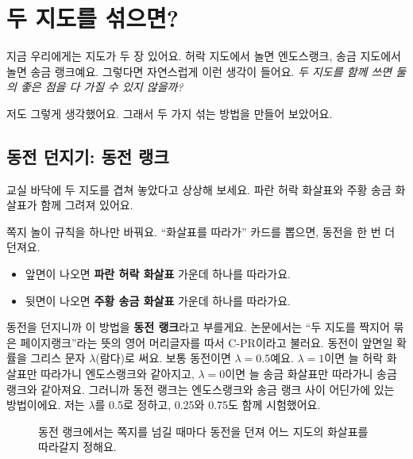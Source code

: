 \chapter{두 지도를 섞으면?}

지금 우리에게는 지도가 두 장 있어요.
허락 지도에서 놀면 엔도스랭크, 송금 지도에서 놀면 송금 랭크예요.
그렇다면 자연스럽게 이런 생각이 들어요.
\emph{두 지도를 함께 쓰면 둘의 좋은 점을 다 가질 수 있지 않을까?}

저도 그렇게 생각했어요.
그래서 두 가지 섞는 방법을 만들어 보았어요.

\section{동전 던지기: 동전 랭크}

교실 바닥에 두 지도를 겹쳐 놓았다고 상상해 보세요.
파란 허락 화살표와 주황 송금 화살표가 함께 그려져 있어요.

쪽지 놀이 규칙을 하나만 바꿔요.
“화살표를 따라가” 카드를 뽑으면, 동전을 한 번 더 던져요.

\begin{itemize}
\item 앞면이 나오면 \textcolor{allowcol}{\textbf{파란 허락 화살표}} 가운데 하나를 따라가요.
\item 뒷면이 나오면 \textcolor{sendcol}{\textbf{주황 송금 화살표}} 가운데 하나를 따라가요.
\end{itemize}

동전을 던지니까 이 방법을 \textbf{동전 랭크}라고 부를게요.
논문에서는 “두 지도를 짝지어 묶은 페이지랭크”라는 뜻의 영어 머리글자를 따서 C-PR이라고 불러요.
동전이 앞면일 확률을 그리스 문자 $\lambda$(람다)로 써요.
보통 동전이면 $\lambda = 0.5$예요.
$\lambda = 1$이면 늘 허락 화살표만 따라가니 엔도스랭크와 같아지고,
$\lambda = 0$이면 늘 송금 화살표만 따라가니 송금 랭크와 같아져요.
그러니까 동전 랭크는 엔도스랭크와 송금 랭크 사이 어딘가에 있는 방법이에요.
저는 $\lambda$를 0.5로 정하고, 0.25와 0.75도 함께 시험했어요.

\begin{figure}[h]
\centering
{}
\caption{동전 랭크에서는 쪽지를 넘길 때마다 동전을 던져 어느 지도의 화살표를 따라갈지 정해요.}
\end{figure}

